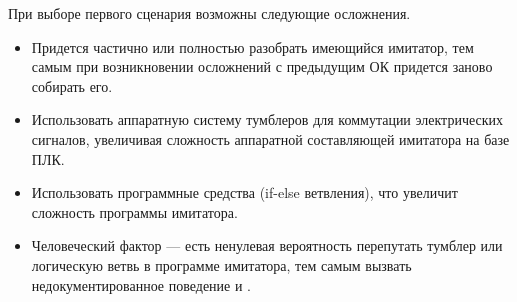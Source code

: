 При выборе первого сценария возможны следующие осложнения.
\begin{itemize}
    \item Придется частично или полностью разобрать имеющийся имитатор, тем самым при возникновении 
        осложнений с предыдущим ОК придется заново собирать его.
    \item Использовать аппаратную систему тумблеров для коммутации электрических сигналов,
        увеличивая сложность аппаратной составляющей имитатора на базе ПЛК.
    \item Использовать программные средства (if-else ветвления), что увеличит сложность программы имитатора.
    \item Человеческий фактор --- есть ненулевая вероятность перепутать тумблер или логическую ветвь в программе имитатора,
        тем самым вызвать недокументированное поведение и .
\end{itemize}